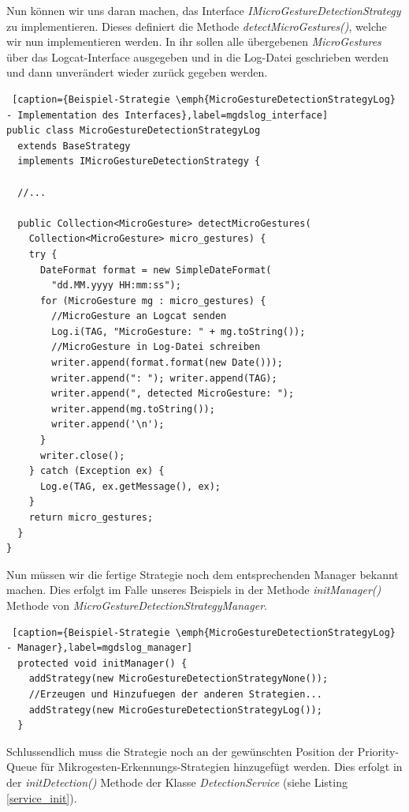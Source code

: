 Nun können wir uns daran machen, das Interface \emph{IMicroGestureDetectionStrategy} zu implementieren. Dieses definiert die Methode \emph{detectMicroGestures()}, welche wir nun implementieren werden. In ihr sollen alle übergebenen \emph{MicroGestures} über das Logcat-Interface ausgegeben und in die Log-Datei geschrieben werden und dann unverändert wieder zurück gegeben werden.

\begin{lstlisting} [caption={Beispiel-Strategie \emph{MicroGestureDetectionStrategyLog} - Implementation des Interfaces},label=mgdslog_interface]
public class MicroGestureDetectionStrategyLog 
  extends BaseStrategy 
  implements IMicroGestureDetectionStrategy {

  //...

  public Collection<MicroGesture> detectMicroGestures(
    Collection<MicroGesture> micro_gestures) {
    try {
      DateFormat format = new SimpleDateFormat(
        "dd.MM.yyyy HH:mm:ss");
      for (MicroGesture mg : micro_gestures) {
        //MicroGesture an Logcat senden
        Log.i(TAG, "MicroGesture: " + mg.toString());
        //MicroGesture in Log-Datei schreiben
        writer.append(format.format(new Date()));
        writer.append(": "); writer.append(TAG);
        writer.append(", detected MicroGesture: ");
        writer.append(mg.toString());
        writer.append('\n');
      }
      writer.close();
    } catch (Exception ex) {
      Log.e(TAG, ex.getMessage(), ex);
    }
    return micro_gestures;
  }
}
\end{lstlisting}

Nun müssen wir die fertige Strategie noch dem entsprechenden Manager bekannt machen. Dies erfolgt im Falle unseres Beispiels in der Methode \emph{initManager()} Methode von \emph{MicroGestureDetectionStrategyManager}.

\begin{lstlisting} [caption={Beispiel-Strategie \emph{MicroGestureDetectionStrategyLog} - Manager},label=mgdslog_manager]
  protected void initManager() {
    addStrategy(new MicroGestureDetectionStrategyNone());
    //Erzeugen und Hinzufuegen der anderen Strategien...
    addStrategy(new MicroGestureDetectionStrategyLog());
  }
\end{lstlisting}

Schlussendlich muss die Strategie noch an der gewünschten Position der Priority-Queue für Mikrogesten-Erkennungs-Strategien hinzugefügt werden. Dies erfolgt in der \emph{initDetection()} Methode der Klasse \emph{DetectionService} (siehe Listing \ref{service_init}).

